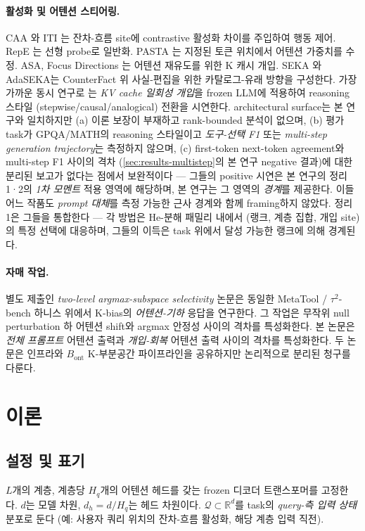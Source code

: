 \documentclass{article}
\theoremstyle{definition}
\newcommand{\R}{\mathbb{R}}
\newcommand{\dh}{d_h}
\newcommand{\Hq}{H_q}
\begin{document}
\paragraph{활성화 및 어텐션 스티어링.}
CAA \citep{rimsky2024caa}와 ITI \citep{li2023iti}는 잔차-흐름 site에 contrastive 활성화 차이를 주입하여 행동 제어. RepE \citep{zou2023repe}는 선형 probe로 일반화. PASTA \citep{zhang2023pasta}는 지정된 토큰 위치에서 어텐션 가중치를 수정. ASA, Focus Directions \citep{zhu2025focus}는 어텐션 재유도를 위한 K 캐시 개입. SEKA \citep{lee2025seka}와 AdaSEKA는 CounterFact 위 사실-편집을 위한 카탈로그-유래 방향을 구성한다. 가장 가까운 동시 연구로 \citet{belitsky2025kvsteer}는 \emph{KV cache 일회성 개입}을 frozen LLM에 적용하여 reasoning 스타일 (stepwise/causal/analogical) 전환을 시연한다. architectural surface는 본 연구와 일치하지만 (a) 이론 보장이 부재하고 rank-bounded 분석이 없으며, (b) 평가 task가 GPQA/MATH의 reasoning 스타일이고 \emph{도구-선택 F1} 또는 \emph{multi-step generation trajectory}는 측정하지 않으며, (c) first-token next-token agreement와 multi-step F1 사이의 격차 (\cref{sec:results-multistep}의 본 연구 negative 결과)에 대한 분리된 보고가 없다는 점에서 보완적이다 --- 그들의 positive 시연은 본 연구의 정리 1·2의 \emph{1차 모멘트} 적용 영역에 해당하며, 본 연구는 그 영역의 \emph{경계}를 제공한다. 이들 어느 작품도 \emph{prompt 대체}를 측정 가능한 근사 경계와 함께 framing하지 않았다. 정리 1은 그들을 통합한다 --- 각 방법은 He-분해 패밀리 내에서 (랭크, 계층 집합, 개입 site)의 특정 선택에 대응하며, 그들의 이득은 task 위에서 달성 가능한 랭크에 의해 경계된다.

\paragraph{자매 작업.} 별도 제출인 \emph{two-level argmax-subspace selectivity} 논문은 동일한 MetaTool / $\tau^2$-bench 하니스 위에서 K-bias의 \emph{어텐션-기하} 응답을 연구한다. 그 작업은 무작위 null perturbation 하 어텐션 shift와 argmax 안정성 사이의 격차를 특성화한다. 본 논문은 \emph{전체 프롬프트} 어텐션 출력과 \emph{개입-회복} 어텐션 출력 사이의 격차를 특성화한다. 두 논문은 인프라와 $B_{\mathrm{ont}}$ K-부분공간 파이프라인을 공유하지만 논리적으로 분리된 청구를 다룬다.

\section{이론}
\label{sec:theory}

\subsection{설정 및 표기}
$L$개의 계층, 계층당 $\Hq$개의 어텐션 헤드를 갖는 frozen 디코더 트랜스포머를 고정한다. $d$는 모델 차원, $\dh = d/\Hq$는 헤드 차원이다. $\mathcal{Q} \subset \R^d$를 task의 \emph{query-측 입력 상태} 분포로 둔다 (예: 사용자 쿼리 위치의 잔차-흐름 활성화, 해당 계층 입력 직전).
\end{document}

